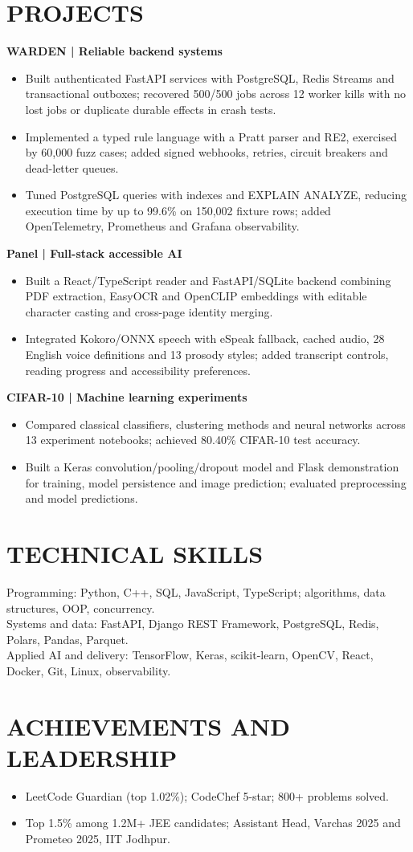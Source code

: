 \documentclass[10pt,a4paper]{article}
\begin{document}
\section*{PROJECTS}
\textbf{WARDEN | Reliable backend systems}
\begin{itemize}
\item Built authenticated FastAPI services with PostgreSQL, Redis Streams and transactional outboxes; recovered 500/500 jobs across 12 worker kills with no lost jobs or duplicate durable effects in crash tests.
\item Implemented a typed rule language with a Pratt parser and RE2, exercised by 60,000 fuzz cases; added signed webhooks, retries, circuit breakers and dead-letter queues.
\item Tuned PostgreSQL queries with indexes and EXPLAIN ANALYZE, reducing execution time by up to 99.6\% on 150,002 fixture rows; added OpenTelemetry, Prometheus and Grafana observability.
\end{itemize}
\textbf{Panel | Full-stack accessible AI}
\begin{itemize}
\item Built a React/TypeScript reader and FastAPI/SQLite backend combining PDF extraction, EasyOCR and OpenCLIP embeddings with editable character casting and cross-page identity merging.
\item Integrated Kokoro/ONNX speech with eSpeak fallback, cached audio, 28 English voice definitions and 13 prosody styles; added transcript controls, reading progress and accessibility preferences.
\end{itemize}
\textbf{CIFAR-10 | Machine learning experiments}
\begin{itemize}
\item Compared classical classifiers, clustering methods and neural networks across 13 experiment notebooks; achieved 80.40\% CIFAR-10 test accuracy.
\item Built a Keras convolution/pooling/dropout model and Flask demonstration for training, model persistence and image prediction; evaluated preprocessing and model predictions.
\end{itemize}
\section*{TECHNICAL SKILLS}
Programming: Python, C++, SQL, JavaScript, TypeScript; algorithms, data structures, OOP, concurrency.\\[2pt]
Systems and data: FastAPI, Django REST Framework, PostgreSQL, Redis, Polars, Pandas, Parquet.\\[2pt]
Applied AI and delivery: TensorFlow, Keras, scikit-learn, OpenCV, React, Docker, Git, Linux, observability.
\section*{ACHIEVEMENTS AND LEADERSHIP}
\begin{itemize}
\item LeetCode Guardian (top 1.02\%); CodeChef 5-star; 800+ problems solved.
\item Top 1.5\% among 1.2M+ JEE candidates; Assistant Head, Varchas 2025 and Prometeo 2025, IIT Jodhpur.
\end{itemize}
\end{document}
